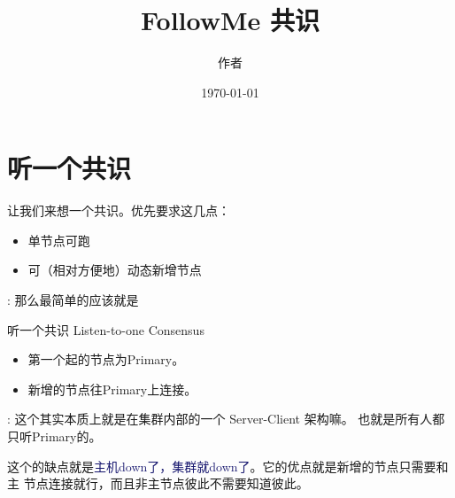 \documentclass[dvipsnames]{ctexart}
\title{FollowMe 共识}
\date{\today}
\author{作者}
\newcommand{\mycola}{MidnightBlue}
\newcommand{\cola}[1]{\textcolor{\mycola}{#1}}
\begin{document}
\maketitle

\section{听一个共识}
让我们来想一个共识。优先要求这几点：
\begin{itemize}
\item 单节点可跑
\item 可（相对方便地）动态新增节点
\end{itemize}
 : 那么最简单的应该就是
\begin{myBox}{听一个共识 Listen-to-one Consensus}
  \label{cons-a}
  \begin{itemize}
  \item 第一个起的节点为Primary。
  \item 新增的节点往Primary上连接。
  \end{itemize}
\end{myBox}

 : 这个其实本质上就是在集群内部的一个 Server-Client 架构嘛。
也就是所有人都只听Primary的。
\begin{center}
\end{center}
这个的缺点就是\cola{主机down了，集群就down了}。它的优点就是新增的节点只需要和主
节点连接就行，而且非主节点彼此不需要知道彼此。

\end{document}
